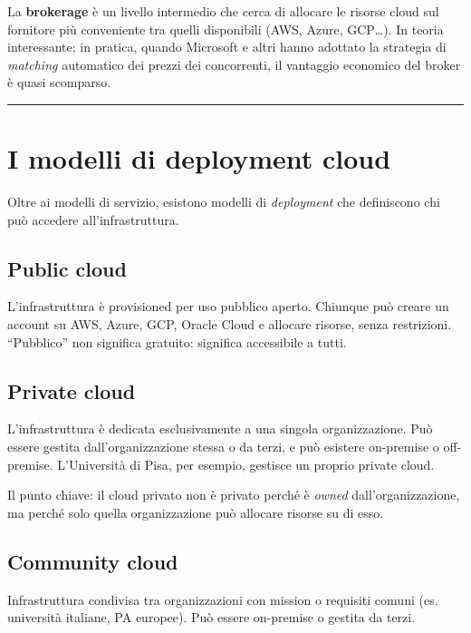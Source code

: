 \documentclass[
  italian,
  openany]{book}
\begin{document}
La \textbf{brokerage} è un livello intermedio che cerca di allocare le
risorse cloud sul fornitore più conveniente tra quelli disponibili (AWS,
Azure, GCP\ldots). In teoria interessante; in pratica, quando Microsoft
e altri hanno adottato la strategia di \emph{matching} automatico dei
prezzi dei concorrenti, il vantaggio economico del broker è quasi
scomparso.

\begin{center}\rule{0.5\linewidth}{0.5pt}\end{center}

\section{I modelli di deployment
cloud}\label{i-modelli-di-deployment-cloud}

Oltre ai modelli di servizio, esistono modelli di \emph{deployment} che
definiscono chi può accedere all'infrastruttura.

\subsection{Public cloud}\label{public-cloud}

L'infrastruttura è provisioned per uso pubblico aperto. Chiunque può
creare un account su AWS, Azure, GCP, Oracle Cloud e allocare risorse,
senza restrizioni. ``Pubblico'' non significa gratuito: significa
accessibile a tutti.

\subsection{Private cloud}\label{private-cloud}

L'infrastruttura è dedicata esclusivamente a una singola organizzazione.
Può essere gestita dall'organizzazione stessa o da terzi, e può esistere
on-premise o off-premise. L'Università di Pisa, per esempio, gestisce un
proprio private cloud.

Il punto chiave: il cloud privato non è privato perché è \emph{owned}
dall'organizzazione, ma perché solo quella organizzazione può allocare
risorse su di esso.

\subsection{Community cloud}\label{community-cloud}

Infrastruttura condivisa tra organizzazioni con mission o requisiti
comuni (es. università italiane, PA europee). Può essere on-premise o
gestita da terzi.
\end{document}
